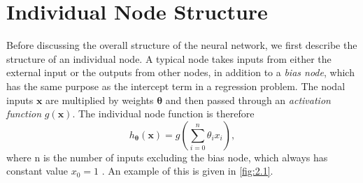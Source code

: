 \documentclass[honours,12pt, twoside]{unswthesis}
\numberwithin{equation}{section}
\theoremstyle{definition}
\begin{document}
\section{Individual Node Structure}\label{sec:2.2}
Before discussing the overall structure of the neural network, we first describe the structure of an individual node. A typical node takes inputs from either the external input or the outputs from other nodes, in addition to a \textit{bias node}, which has the same purpose as the intercept term in a regression problem. The nodal inputs $\bm{x}$ are multiplied by weights $\bm{\theta}$ and then passed through an \textit{activation function} $g(\bm{x})$. The individual node function is therefore \[h_{\bm{\theta}}(\bm{x})=g\left(\sum\limits^n_{i=0}\theta_ix_i\right),\] where n is the number of inputs excluding the bias node, which always has constant value $x_0=1$ \citep{neuralstat}. An example of this is given in \autoref{fig:2.1}. 
\end{document}
